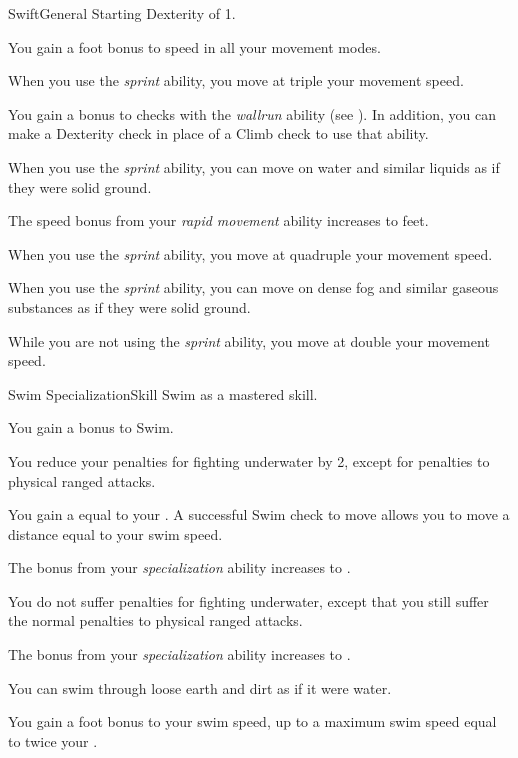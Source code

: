     \begin{feat}{Swift}{General}
        \featpre Starting Dexterity of 1.

         You gain a  foot bonus to speed in all your movement modes.

         When you use the \textit{sprint} ability, you move at triple your movement speed.

         You gain a  bonus to checks with the \textit{wallrun} ability (see ).
        In addition, you can make a Dexterity check in place of a Climb check to use that ability.

         When you use the \textit{sprint} ability, you can move on water and similar liquids as if they were solid ground.

         The speed bonus from your \textit{rapid movement} ability increases to  feet.

         When you use the \textit{sprint} ability, you move at quadruple your movement speed.

         When you use the \textit{sprint} ability, you can move on dense fog and similar gaseous substances as if they were solid ground.

         While you are not using the \textit{sprint} ability, you move at double your movement speed.
    \end{feat}

    \begin{feat}{Swim Specialization}{Skill}
        \featpre Swim as a mastered skill.

         You gain a  bonus to Swim.

         You reduce your penalties for fighting underwater by 2, except for penalties to physical ranged attacks.

         You gain a  equal to your .
        A successful Swim check to move allows you to move a distance equal to your swim speed.

         The bonus from your \textit{specialization} ability increases to .

         You do not suffer penalties for fighting underwater, except that you still suffer the normal penalties to physical ranged attacks.

         The bonus from your \textit{specialization} ability increases to .

         You can swim through loose earth and dirt as if it were water.

         You gain a  foot bonus to your swim speed, up to a maximum swim speed equal to twice your .
    \end{feat}

